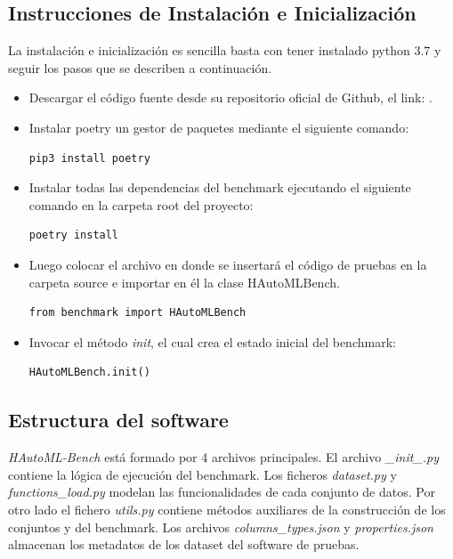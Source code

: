 \subsection{Instrucciones de Instalación e Inicialización}\label{subsection:instructions}
La instalación e inicialización es sencilla basta con tener instalado python 3.7 y seguir los pasos que se describen a continuación.
\begin{itemize}
\item Descargar el código fuente desde su repositorio oficial de Github, el link: . 
\item Instalar poetry un gestor de paquetes mediante el siguiente comando:
\begin{lstlisting}[language = bash, caption= Instalar poetry]
pip3 install poetry
\end{lstlisting}   

\item Instalar todas las dependencias del benchmark ejecutando el siguiente comando en la carpeta root del proyecto: 
\begin{lstlisting}[language = bash, caption= Instalar dependencias]
poetry install
\end{lstlisting}  

\item Luego colocar el archivo en donde se insertará el código de pruebas en la carpeta source e importar en él la clase HAutoMLBench.
\begin{lstlisting}[caption= Importar HAutoMLBench,label = code:import]
from benchmark import HAutoMLBench
\end{lstlisting}

\item Invocar el método \textit{init}, el cual crea el estado inicial del benchmark: 
\begin{lstlisting}[caption= Invocar init ,label = code:init]
HAutoMLBench.init()
\end{lstlisting}

\end{itemize}

\subsection{Estructura del software}\label{subsection:struct}


\textit{HAutoML-Bench} está formado por 4 archivos principales. El archivo \newline \textit{\_init\_.py} contiene la lógica de ejecución del benchmark.
Los ficheros \textit{dataset.py} y \textit{functions\_load.py} modelan las funcionalidades de cada conjunto de datos. Por otro lado el fichero \textit{utils.py} 
contiene métodos auxiliares de la construcción de los conjuntos y del benchmark. 
Los archivos \textit{columns\_types.json} y \textit{properties.json} almacenan los metadatos de los dataset del software de pruebas. 
 
